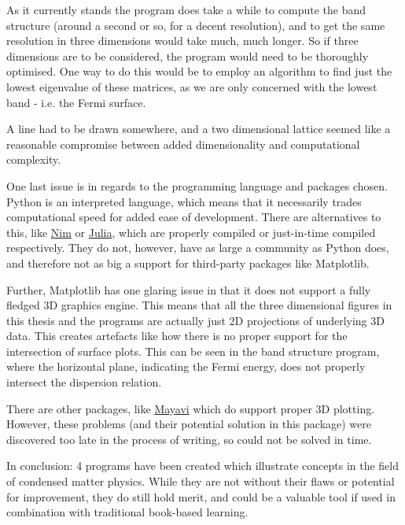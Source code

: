 \documentclass[main.tex]{subfiles}
\begin{document}
	As it currently stands the program does take a while to compute the band structure (around a second or so, for a decent resolution), and to get the same resolution in three dimensions would take much, much longer. So if three dimensions are to be considered, the program would need to be thoroughly optimised. One way to do this would be to employ an algorithm to find just the lowest eigenvalue of these matrices, as we are only concerned with the lowest band - i.e. the Fermi surface. 
	
	A line had to be drawn somewhere, and a two dimensional lattice seemed like a reasonable compromise between added dimensionality and computational complexity.
	
	One last issue is in regards to the programming language and packages chosen. Python is an interpreted language, which means that it necessarily trades computational speed for added ease of development. There are alternatives to this, like \href{https://nim-lang.org/}{Nim} or \href{https://julialang.org/}{Julia}, which are properly compiled or just-in-time compiled respectively. They do not, however, have as large a community as Python does, and therefore not as big a support for third-party packages like Matplotlib.
	
	Further, Matplotlib has one glaring issue in that it does not support a fully fledged 3D graphics engine. This means that all the three dimensional figures in this thesis and the programs are actually just 2D projections of underlying 3D data. This creates artefacts like how there is no proper support for the intersection of surface plots. This can be seen in the band structure program, where the horizontal plane, indicating the Fermi energy, does not properly intersect the dispersion relation. 
	
	There are other packages, like \href{https://docs.enthought.com/mayavi/mayavi/}{Mayavi} which do support proper 3D plotting. However, these problems (and their potential solution in this package) were discovered too late in the process of writing, so could not be solved in time.
	
	In conclusion: 4 programs have been created which illustrate concepts in the field of condensed matter physics. While they are not without their flaws or potential for improvement, they do still hold merit, and could be a valuable tool if used in combination with traditional book-based learning.
	
\end{document}
